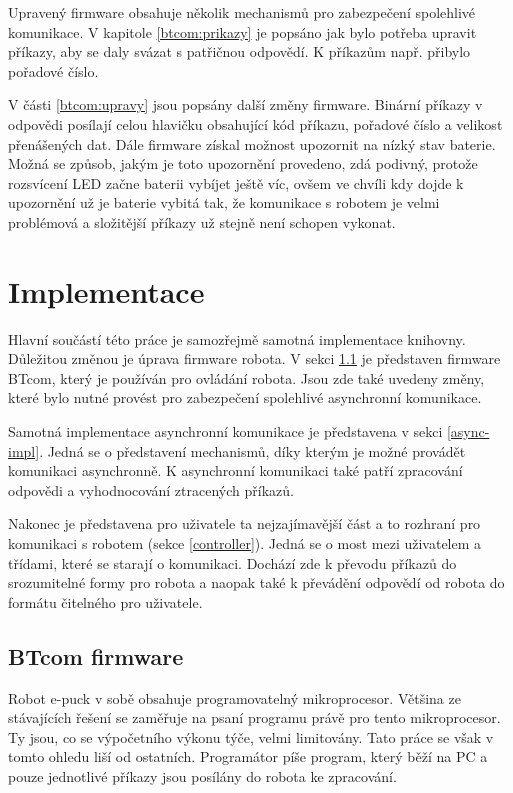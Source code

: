 \documentclass[12pt,notitlepage]{report}
\begin{document}
    Upravený firmware obsahuje několik mechanismů pro zabezpečení spolehlivé
    komunikace. V kapitole \ref{btcom:prikazy} je popsáno jak bylo potřeba
    upravit příkazy, aby se daly svázat s patřičnou odpovědí. K příkazům např.
    přibylo pořadové číslo.
    
    V části \ref{btcom:upravy} jsou popsány další změny firmware. Binární
    příkazy v odpovědi posílají celou hlavičku obsahující kód příkazu, pořadové
    číslo a velikost přenášených dat. Dále firmware získal možnost upozornit na
    nízký stav baterie. Možná se způsob, jakým je toto upozornění provedeno,
    zdá podivný, protože rozsvícení LED začne baterii vybíjet ještě víc, ovšem
    ve chvíli kdy dojde k upozornění už je baterie vybitá tak, že komunikace s
    robotem je velmi problémová a složitější příkazy už stejně není schopen
    vykonat.

\chapter{Implementace}
\label{Implementace}

    Hlavní součástí této práce je samozřejmě samotná implementace knihovny.
    Důležitou změnou je úprava firmware robota. V sekci \ref{btcom} je
    představen firmware BTcom, který je používán pro ovládání robota. Jsou zde
    také uvedeny změny, které bylo nutné provést pro zabezpečení spolehlivé
    asynchronní komunikace.

    Samotná implementace asynchronní komunikace je představena v sekci
    \ref{async-impl}. Jedná se o představení mechanismů, díky kterým je možné
    provádět komunikaci asynchronně. K asynchronní komunikaci také patří
    zpracování odpovědi a vyhodnocování ztracených příkazů.

    Nakonec je představena pro uživatele ta nejzajímavější část a to rozhraní
    pro komunikaci s robotem (sekce \ref{controller}). Jedná se o most mezi
    uživatelem a třídami, které se starají o komunikaci. Dochází zde k převodu
    příkazů do srozumitelné formy pro robota a naopak také k převádění odpovědí
    od robota do formátu čitelného pro uživatele.

    \section{BTcom firmware}
    \label{btcom}

    Robot e-puck v sobě obsahuje programovatelný mikroprocesor. Většina ze
    stávajících řešení se zaměřuje na psaní programu právě pro tento
    mikroprocesor. Ty jsou, co se výpočetního výkonu týče, velmi limitovány.
    Tato práce se však v tomto ohledu liší od ostatních. Programátor píše
    program, který běží na PC a pouze jednotlivé příkazy jsou posílány do
    robota ke zpracování.
\end{document}
